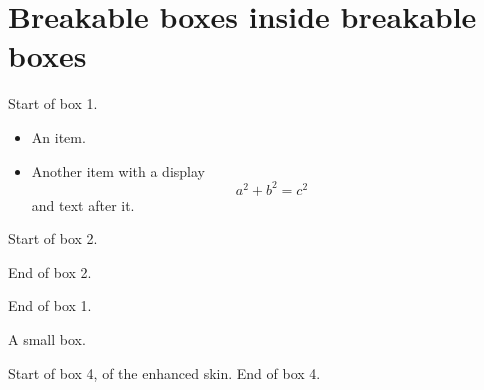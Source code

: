 \expandafter\documentclass\expandafter[\CLSOPT]{\CLS}
\begin{document}
\section*{Breakable boxes inside breakable boxes}


\begin{tcolorbox}[breakable, title=Outer box 1]
\begin{tcolorbox}[breakable, colback=yellow!20, colframe=blue!60!black,
  title=Box 1]
Start of box 1. 
\begin{itemize}
\item An item. 
\item Another item with a display
  \[ a^2 + b^2 = c^2 \]
  and text after it.
\end{itemize}
\begin{tcolorbox}[breakable, colback=red!10, colframe=red!60!black,
  title=Box 2 in box 1]
Start of box 2. 
\begin{tcolorbox}[colback=white, title=An ordinary box in box 2]
\end{tcolorbox}
End of box 2.
\end{tcolorbox}
End of box 1.
\end{tcolorbox}
\begin{tcolorbox}[breakable, colback=green!10, title=Box 3]
A small box.
\end{tcolorbox}
\begin{tcolorbox}[breakable, enhanced, colback=cyan!10,
  colframe=cyan!50!black]
Start of box 4, of the enhanced skin. 
End of box 4.
\end{tcolorbox}
\end{tcolorbox}
\end{document}
